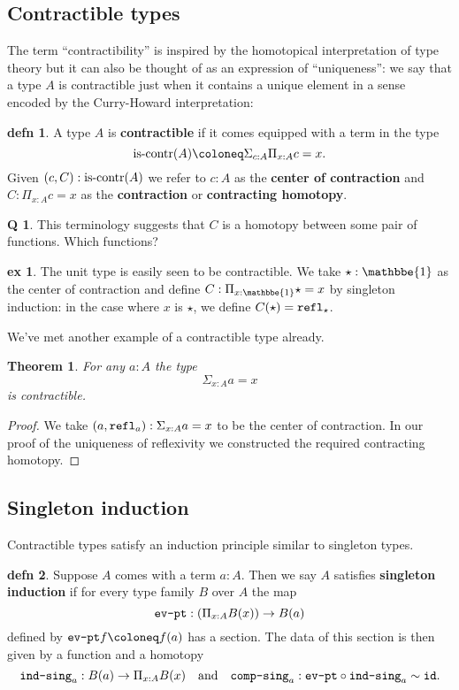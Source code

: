 \documentclass{amsart}
\theoremstyle{theorem}
\newtheorem*{thm}{Theorem}
\theoremstyle{definition}
\newtheorem*{defn}{defn}
\newtheorem*{ex}{ex}
\newtheorem*{q}{Q}
\theoremstyle{remark}
\newcommand{\0}{\mathbbe{0}}
\newcommand{\1}{\mathbbe{1}}
\newcommand{\2}{\mathbbe{2}}
\newcommand{\3}{\mathbbe{3}}
\newcommand{\4}{\mathbbe{4}}
\newcommand{\term}[1]{{\textup{\texttt{#1}}}}
\newcommand{\type}[1]{{\textup{#1}}}
\newcommand{\id}{\term{id}}
\newcommand{\refl}{\term{refl}}
\newcommand{\is}[1]{\type{is-{#1}}}
\begin{document}
\subsection*{Contractible types}

The term ``contractibility'' is inspired by the homotopical interpretation of type theory but it can also be thought of as an expression of ``uniqueness'': we say that a type $A$ is contractible just when it contains a unique element in a sense encoded by the Curry-Howard interpretation:

\begin{defn} A type $A$ is \textbf{contractible} if it comes equipped with a term in the type
\[ \is{contr}(A) \coloneq \Sigma_{c :A}\Pi_{x :A} c =x.\]
Given $(c,C) : \is{contr}(A)$ we refer to $c :A$ as the \textbf{center of contraction} and $C : \Pi_{x:A} c =x$ as the \textbf{contraction} or \textbf{contracting homotopy}.
\end{defn}

\begin{q} This terminology suggests that $C$ is a homotopy between some pair of functions. Which functions?
\end{q}

\begin{ex} The unit type is easily seen to be contractible. We take $\star : \1$ as the center of contraction and define $C : \Pi_{x:\1} \star = x$ by singleton induction: in the case where $x$ is $\star$, we define $C(\star) = \refl_\star$.
\end{ex}

We've met another example of a contractible type already.

\begin{thm} For any $a : A$ the type
\[ \Sigma_{x:A}a =x\]
is contractible.
\end{thm}
\begin{proof}
We take $(a,\refl_a) : \Sigma_{x:A} a =x$ to be the center of contraction. In our proof of the uniqueness of reflexivity we constructed the required contracting homotopy.
\end{proof}

\subsection*{Singleton induction}

Contractible types satisfy an induction principle similar to singleton types.

\begin{defn} Suppose $A$ comes with a term $a :A$. Then we say $A$ satisfies \textbf{singleton induction} if for every type family $B$ over $A$ the map
\[
\term{ev-pt} : \left(\Pi_{x:A} B(x)\right) \to B(a)
\]
defined by $\term{ev-pt}f \coloneq f(a)$ has a section. The data of this section is then given by a function and a homotopy
\[ \term{ind-sing}_a : B(a) \to \Pi_{x:A} B(x) \quad \text{and} \quad \term{comp-sing}_a : \term{ev-pt}\circ\term{ind-sing}_a \sim \id.\]
\end{defn}
\end{document}
